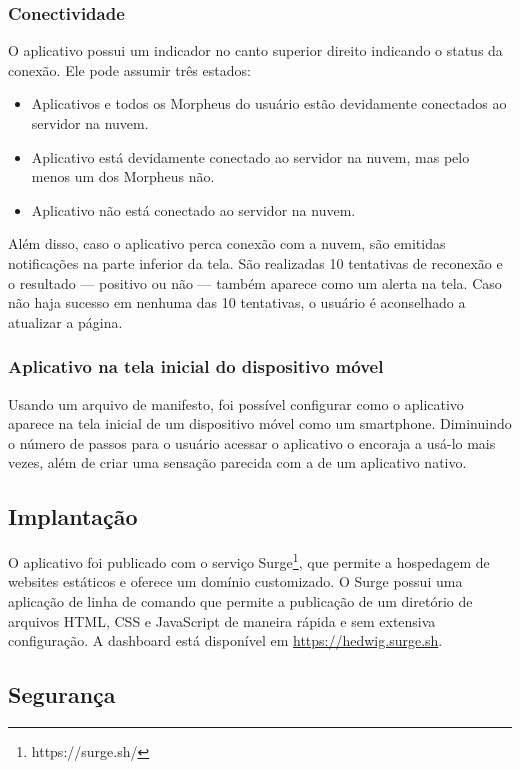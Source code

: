 \subsubsection{Conectividade}

O aplicativo possui um indicador no canto superior direito indicando o status da conexão. Ele pode assumir três estados:

\begin{itemize}
\item Aplicativos e todos os Morpheus do usuário estão devidamente conectados ao servidor na nuvem.
\item Aplicativo está devidamente conectado ao servidor na nuvem, mas pelo menos um dos Morpheus não.
\item Aplicativo não está conectado ao servidor na nuvem.
\end{itemize}

Além disso, caso o aplicativo perca conexão com a nuvem, são emitidas notificações na parte inferior da tela. São realizadas 10 tentativas de reconexão e o resultado --- positivo ou não --- também aparece como um alerta na tela. Caso não haja sucesso em nenhuma das 10 tentativas, o usuário é aconselhado a atualizar a página.

\subsubsection{Aplicativo na tela inicial do dispositivo móvel}

Usando um arquivo de manifesto, foi possível configurar como o aplicativo aparece na tela inicial de um dispositivo móvel como um smartphone. Diminuindo o número de passos para o usuário acessar o aplicativo o encoraja a usá-lo mais vezes, além de criar uma sensação parecida com a de um aplicativo nativo.

\subsection{Implantação}

O aplicativo foi publicado com o serviço Surge\footnote{https://surge.sh/}, que permite a hospedagem de websites estáticos e oferece um domínio customizado. O Surge possui uma aplicação de linha de comando que permite a publicação de um diretório de arquivos HTML, CSS e JavaScript de maneira rápida e sem extensiva configuração. A dashboard está disponível em \url{https://hedwig.surge.sh}.

\subsection{Segurança}

